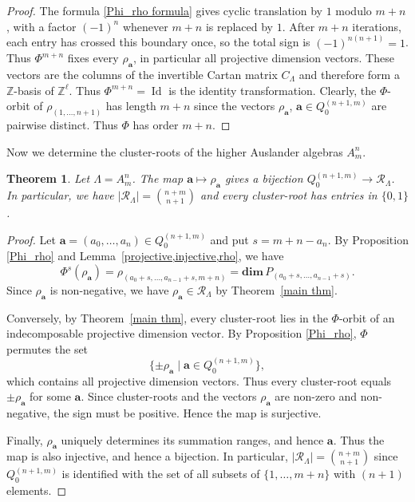 \documentclass[11pt,a4paper]{amsart}
\newtheorem{theorem}{Theorem}[section]
\theoremstyle{definition}
\numberwithin{equation}{section}
\newcommand{\0}{\mathbf{0}}
\newcommand{\dimv}{\mathbf{dim}\,}
\begin{document}
\begin{proof}
		The formula \eqref{Phi_rho formula} gives cyclic translation by $1$ modulo $m+n$,
		with a factor $(-1)^n$ whenever $m+n$ is replaced by $1$.
		After $m+n$ iterations, each entry has crossed this boundary
		once, so the total sign is $(-1)^{n(n+1)}=1$.
		Thus $\Phi^{m+n}$ fixes every $\rho_{\mathbf a}$,
		in particular all projective dimension vectors.
		These vectors are the columns of the invertible Cartan matrix
		$C_\Lambda$ and therefore form a $\mathbb Z$-basis of
		$\mathbb Z^\ell$. Thus
		 $\Phi^{m+n}=\operatorname{Id}$  is the identity transformation. Clearly, the $\Phi$-orbit of
		 $\rho_{(1,\ldots,n+1)}$ has length $m+n$ since the vectors $\rho_{\mathbf a}$, $\mathbf{a}\in Q_0^{(n+1,m)}$ are pairwise distinct. Thus $\Phi$ has order $m+n$.
	\end{proof}
	
	Now we  determine the cluster-roots of the higher
	Auslander algebras $A_m^n$.
	
	\begin{theorem} \label{cluster-roots of A_m^n}
		Let $\Lambda=A_m^n$. The map $\mathbf a\mapsto\rho_{\mathbf a}$ gives a  bijection
		$Q_0^{(n+1,m)}\to\mathcal R_\Lambda$.  In particular, we have $|\mathcal R_\Lambda|=\binom{n+m}{n+1}$ and every cluster-root has entries in $\{0,1\}$.
	\end{theorem}
	\begin{proof}
		Let $\mathbf a=(a_0,\ldots,a_n)\in Q_0^{(n+1,m)}$
		and put $s=m+n-a_n$.
		By Proposition \ref{Phi_rho} and
		Lemma~\ref{projective,injective,rho}, we have
		\[
		\Phi^s(\rho_{\mathbf a})
		=\rho_{(a_0+s,\ldots,a_{n-1}+s,m+n)}
		=\dimv P_{(a_0+s,\ldots,a_{n-1}+s)}.
		\]
		Since $\rho_{\mathbf a}$ is non-negative,
		  we have $\rho_{\mathbf a}\in\mathcal R_\Lambda$ by Theorem~\ref{main thm}.
		
		Conversely, by Theorem~\ref{main thm}, every cluster-root
		lies in the $\Phi$-orbit of an indecomposable projective
		dimension vector. By Proposition \ref{Phi_rho}, $\Phi$
		permutes the set
		\[
		\{\pm\rho_{\mathbf a}\mid
		\mathbf a\in Q_0^{(n+1,m)}\},
		\]
		which contains all projective dimension vectors.
		Thus every cluster-root equals $\pm\rho_{\mathbf a}$
		for some $\mathbf a$. Since cluster-roots and the
		vectors $\rho_{\mathbf a}$ are non-zero and non-negative,
		the sign must be positive. Hence the map is surjective.
		
		Finally, $\rho_{\mathbf a}$ uniquely determines its
		summation ranges, and hence $\mathbf a$.
		Thus the map is also injective, and hence a bijection.  In particular, $|\mathcal R_\Lambda|=\binom{n+m}{n+1}$
		since $Q_0^{(n+1,m)}$ is identified with the set of all
		 subsets of $\{1,\ldots,m+n\}$ with $(n+1)$ elements.
	\end{proof}
	
\end{document}
